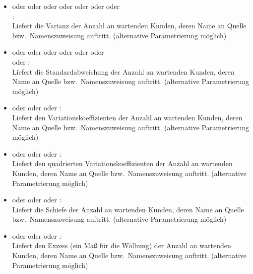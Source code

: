 \begin{itemize}
\item
{} oder  oder  oder  oder  oder  oder  oder\\
:\\
Liefert die Varianz der Anzahl an wartenden Kunden, deren Name an Quelle bzw.\ Namenszuweisung  auftritt.
(alternative Parametrierung möglich)

\item
{} oder  oder  oder  oder  oder  oder\\  oder :\\
Liefert die Standardabweichung der Anzahl an wartenden Kunden, deren Name an Quelle bzw.\ Namenszuweisung  auftritt.
(alternative Parametrierung möglich)

\item
{} oder  oder  oder :\\
Liefert den Variationskoeffizienten der Anzahl an wartenden Kunden, deren Name an Quelle bzw.\ Namenszuweisung  auftritt.
(alternative Parametrierung möglich)

\item
{} oder  oder  oder :\\
Liefert den quadrierten Variationskoeffizienten der Anzahl an wartenden Kunden, deren Name an Quelle bzw.\ Namenszuweisung  auftritt.
(alternative Parametrierung möglich)

\item
{} oder  oder  oder :\\
Liefert die Schiefe der Anzahl an wartenden Kunden, deren Name an Quelle bzw.\ Namenszuweisung  auftritt.
(alternative Parametrierung möglich)

\item
{} oder  oder  oder :\\
Liefert den Exzess (ein Maß für die Wölbung) der Anzahl an wartenden Kunden, deren Name an Quelle bzw.\ Namenszuweisung  auftritt.
(alternative Parametrierung möglich)


\end{itemize}
